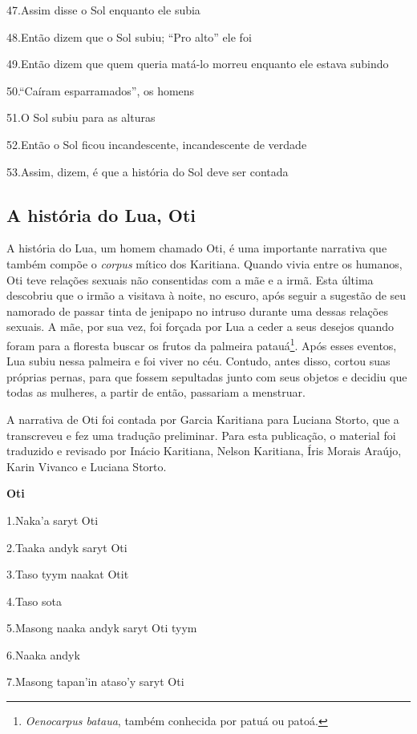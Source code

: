 47.Assim disse o Sol enquanto ele subia

48.Então dizem que o Sol subiu; ``Pro alto'' ele foi

49.Então dizem que quem queria matá-lo morreu enquanto ele estava
subindo

50.``Caíram esparramados'', os homens

51.O Sol subiu para as alturas

52.Então o Sol ficou incandescente, incandescente de verdade

53.Assim, dizem, é que a história do Sol deve ser contada

\subsection{A história do Lua, Oti}\label{a-histuxf3ria-do-lua-oti}

A história do Lua, um homem chamado Oti, é uma importante narrativa que
também compõe o \emph{corpus} mítico dos Karitiana. Quando vivia entre
os humanos, Oti teve relações sexuais não consentidas com a mãe e a
irmã. Esta última descobriu que o irmão a visitava à noite, no escuro,
após seguir a sugestão de seu namorado de passar tinta de jenipapo no
intruso durante uma dessas relações sexuais. A mãe, por sua vez, foi
forçada por Lua a ceder a seus desejos quando foram para a floresta
buscar os frutos da palmeira patauá\footnote{\emph{Oenocarpus bataua},
  também conhecida por patuá ou patoá.}. Após esses eventos, Lua subiu
nessa palmeira e foi viver no céu. Contudo, antes disso, cortou suas
próprias pernas, para que fossem sepultadas junto com seus objetos e
decidiu que todas as mulheres, a partir de então, passariam a menstruar.

A narrativa de Oti foi contada por Garcia Karitiana para Luciana Storto,
que a transcreveu e fez uma tradução preliminar. Para esta publicação, o
material foi traduzido e revisado por Inácio Karitiana, Nelson
Karitiana, Íris Morais Araújo, Karin Vivanco e Luciana Storto.

\textbf{Oti}

1.Naka'a saryt Oti

2.Taaka andyk saryt Oti

3.Taso tyym naakat Otit

4.Taso sota

5.Masong naaka andyk saryt Oti tyym

6.Naaka andyk

7.Masong tapan'in ataso'y saryt Oti


